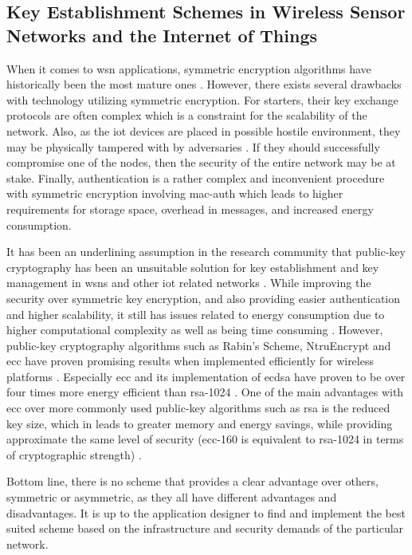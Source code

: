 
\subsection{Key Establishment Schemes in Wireless Sensor Networks and the Internet of Things}

When it comes to \gls{wsn} applications, symmetric encryption algorithms have historically been the most mature ones \citep{Jing2014}. However, there exists several drawbacks with technology utilizing symmetric encryption. For starters, their key exchange protocols are often complex which is a constraint for the scalability of the network. Also, as the \gls{iot} devices are placed in possible hostile environment, they may be physically tampered with by adversaries \cite{krentz20136lowpan}. If they should successfully compromise one of the nodes, then the security of the entire network may be at stake. Finally, authentication is a rather complex and inconvenient procedure with symmetric encryption involving \gls{mac-auth} which leads to higher requirements for storage space, overhead in messages, and increased energy consumption.

It has been an underlining assumption in the research community that public-key cryptography has been an unsuitable solution for key establishment and key management in \gls{wsn}s and other \gls{iot} related networks \cite{wander2005energy} \cite{gaubatz2004public}. While improving the security over symmetric key encryption, and also providing easier authentication and higher scalability, it still has issues related to energy consumption due to higher computational complexity as well as being time consuming \citep{Eschenauer2002}. However, public-key cryptography algorithms such as Rabin's Scheme, NtruEncrypt and \gls{ecc} have proven promising results when implemented efficiently for wireless platforms \cite{Jing2014} \cite{gaubatz2004public}. Especially \gls{ecc} and its implementation of \gls{ecdsa} have proven to be over four times more energy efficient than \gls{rsa}-1024 \cite{wander2005energy}. One of the main advantages with \gls{ecc} over more commonly used public-key algorithms such as \gls{rsa} is the reduced key size, which in leads to greater memory and energy savings, while providing approximate the same level of security (\gls{ecc}-160 is equivalent to \gls{rsa}-1024 in terms of cryptographic strength) \cite{nist2016}.

Bottom line, there is no scheme that provides a clear advantage over others, symmetric or asymmetric, as they all have different advantages and disadvantages. It is up to the application designer to find and implement the best suited scheme based on the infrastructure and security demands of the particular network.


